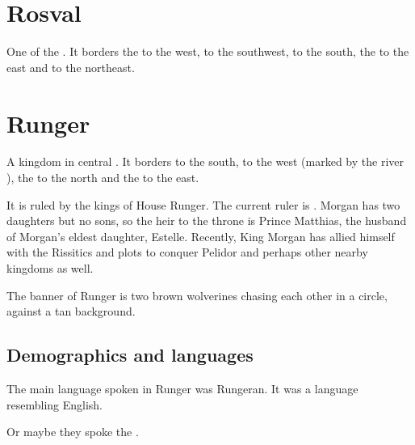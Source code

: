 \section{Rosval}
One of the . 
It borders the  to the west,  to the southwest,  to the south, the  to the east and  to the northeast. 















\section{Runger}
A kingdom in central . 
It borders  to the south,  to the west (marked by the river ), the  to the north and the  to the east. 


It is ruled by the kings of House Runger. 
The current ruler is . 
Morgan has two daughters but no sons, so the heir to the throne is Prince Matthias, the husband of Morgan's eldest daughter, Estelle. Recently, King Morgan has allied himself with the Rissitics and plots to conquer Pelidor and perhaps other nearby kingdoms as well. 

The banner of Runger is two brown wolverines chasing each other in a circle, against a tan background.









\subsection{Demographics and languages}
The main language spoken in Runger was Rungeran. 
It was a \human language resembling English. 

Or maybe they spoke the .









